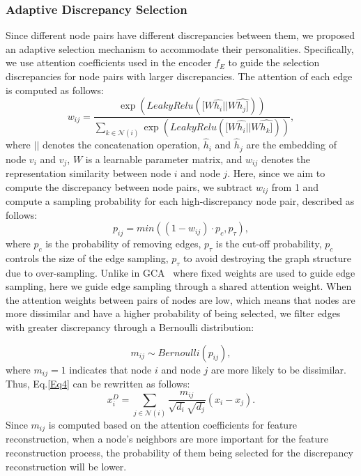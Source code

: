 \documentclass[sigconf]{acmart}
\begin{document}
\subsubsection{Adaptive Discrepancy Selection}
Since different node pairs have different discrepancies between them, we proposed an adaptive selection mechanism to accommodate their personalities. Specifically, we use attention coefficients used in the encoder $f_E$ to guide the selection discrepancies for node pairs with larger discrepancies. The attention of each edge is computed as follows:
\begin{equation}
    w_{ij} = \frac{\exp(LeakyRelu( [W\hat{h_i} || W\hat{h_j]}))}{\sum_{k\in\mathcal{N}(i)}\exp(LeakyRelu([W\hat{h_i} || W\hat{h_k]}))},
\end{equation}
where $||$ denotes the concatenation operation, $\hat{h}_i$ and $\hat{h}_j$ are the embedding of node $v_i$ and $v_j$, $W$ is a learnable parameter matrix, and $w_{ij}$ denotes the representation similarity between node $i$ and node $j$. Here, since we aim to compute the discrepancy between node pairs, we subtract $w_{ij}$ from 1 and compute a sampling probability for each high-discrepancy node pair, described as follows:
\begin{equation}
    p_{ij} = min((1-w_{ij}) \cdot p_c, p_\tau),
\end{equation}
 where $p_c$ is the probability of removing edges, $p_\tau$ is the cut-off probability, $p_c$ controls the size of the edge sampling, $p_\tau$ to avoid destroying the graph structure due to over-sampling. Unlike in GCA~\cite{GCA} where fixed weights are used to guide edge sampling, here we guide edge sampling through a shared attention weight. When the attention weights between pairs of nodes are low, which means that nodes are more dissimilar and have a higher probability of being selected, we filter edges with greater discrepancy through a Bernoulli distribution: 

\begin{equation}
    m_{ij} \sim Bernoulli(p_{ij}),
\end{equation}
where $m_{ij}=1$ indicates that node $i$ and node $j$ are more likely to be dissimilar. Thus, Eq.\ref{Eq4} can be rewritten as follows:
\begin{equation}
    x_i^{D} = \sum\limits_{j \in \mathcal{N}(i)}\frac{m_{ij}}{\sqrt{d_i} \sqrt{d_j}}(x_i - x_j).\label{Eq9}
\end{equation}
Since $m_{ij}$ is computed based on the attention coefficients for feature reconstruction, when a node's neighbors are more important for the feature reconstruction process, the probability of them being selected for the discrepancy reconstruction will be lower.
\end{document}
